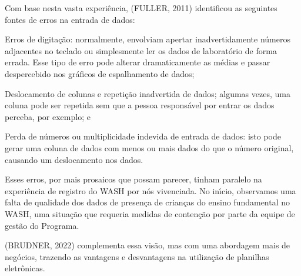 \documentclass[
12pt,		%
openright,	%
twoside,  %
a4paper,			%
chapter=TITLE,		%
english,			%
french,				%
spanish,			%
brazil				%
]{USPSC-classe/USPSC}
\begin{document}
Com base nesta vasta experi\^encia,  (FULLER, 2011) identificou as seguintes fontes de erros na entrada de dados:


















\begin{alineas}
\item Erros de digita\c{c}\~ao: normalmente, envolviam apertar inadvertidamente n\'umeros adjacentes no teclado ou simplesmente ler os dados de laborat\'orio de forma errada. Esse tipo de erro pode alterar dramaticamente as m\'edias e passar despercebido nos gr\'aficos de espalhamento de dados;
\item Deslocamento de colunas e repeti\c{c}\~ao inadvertida de dados; algumas vezes, uma coluna pode ser repetida sem que a pessoa respons\'avel por entrar os dados perceba, por exemplo; e
\item Perda de n\'umeros ou multiplicidade indevida de entrada de dados: isto pode gerar uma coluna de dados com menos ou mais dados do que o n\'umero original, causando um deslocamento nos dados.
\end{alineas}

Esses erros, por mais prosaicos que possam parecer, tinham paralelo na experi\^encia de registro do WASH por n\'os vivenciada. No in\'{\i}cio, observamos uma falta de qualidade dos dados de presen\c{c}a de crian\c{c}as do ensino fundamental no WASH, uma situa\c{c}\~ao que requeria medidas de conten\c{c}\~ao por parte da equipe de gest\~ao do Programa.

















(BRUDNER, 2022) complementa essa vis\~ao, mas com uma abordagem mais de neg\'ocios, trazendo as vantagens e desvantagens na utiliza\c{c}\~ao de planilhas eletr\^onicas.
\end{document}
